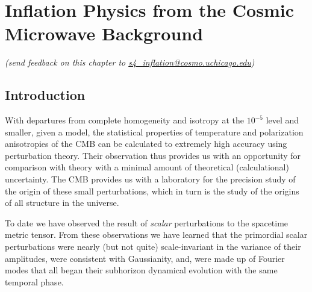  
\chapter{Inflation Physics from the Cosmic Microwave Background}



\begin{center}
{\small {\it (send feedback on this chapter to \href{mailto:s4\_inflation@cosmo.uchicago.edu}{s4\_inflation@cosmo.uchicago.edu})}}
\end{center}



\section{Introduction}

With departures from complete homogeneity and isotropy at the $10^{-5}$ level and smaller, given a model, the statistical properties of temperature and polarization anisotropies of the CMB can be calculated to extremely high accuracy using perturbation theory. Their observation thus provides us with an opportunity for comparison with theory with a minimal amount of theoretical (calculational) uncertainty. The CMB provides us with a laboratory for the precision study of the origin of these small perturbations, which in turn is the study of the origins of all structure in the universe.

To date we have observed the result of {\em scalar} perturbations to the spacetime metric tensor. From these observations we have learned that the primordial scalar perturbations were nearly (but not quite) scale-invariant in the variance of their amplitudes, were consistent with Gaussianity, and, were made up of Fourier modes that all began their subhorizon dynamical evolution with the same temporal phase. 

